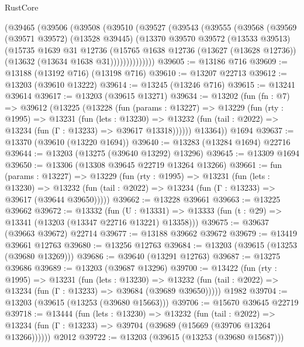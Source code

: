 \begin{lexlean}{RustCore}
\begin{coremodule}
    (@39465
      (@39506
        (@39508
          (@39510
            (@39527
              (@39543
                (@39555
                  (@39568
                    (@39569
                      (@39571 @39572)
                      (@13528 @39445)
                      (@13370
                        @39570
                        @39572
                        (@13533 @39513)
                        (@15735
                          @1639
                          @31
                          @12736
                          (@15765
                            @1638
                            @12736
                            (@13627 (@13628 @12736))
                            (@13632 (@13634 @1638 @31))))))))))))))
@39605 := @13186 @716
@39609 := @13188 (@13192 @716) (@13198 @716)
@39610 := @13207 @22713
@39612 := @13203 (@39610 @13222)
@39614 := @13245 (@13246 @716)
@39615 := @13241 @39614
@39617 := @13203 (@39615 @13271)
@39634 := @13202
    (fun (fn : @7) =>
    @39612
      (@13225
        (@13228
          (fun (params : @13227) =>
          @13229
            (fun (rty : @1995) =>
            @13231
              (fun (lets : @13230) =>
              @13232 (fun (tail : @2022) => @13234 (fun (Γ : @13233) => @39617 @13318))))))
        @13364))
    @1694
@39637 := @13370 (@39610 (@13220 @1694))
@39640 := @13283 (@13284 @1694) @22716
@39644 := @13203 (@13275 (@39640 @13292) @13296)
@39645 := @13309 @1694
@39650 := @13306 (@13308 @39645 @22719 @13264 @13266)
@39661 := fun (params : @13227) =>
  @13229
    (fun (rty : @1995) =>
    @13231
      (fun (lets : @13230) =>
      @13232 (fun (tail : @2022) => @13234 (fun (Γ : @13233) => @39617 (@39644 @39650)))))
@39662 := @13228 @39661
@39663 := @13225 @39662
@39672 := @13332
    (fun (U : @13331) => @13333 (fun (t : @29) => @13341 (@13203 (@13347 @22716 @13221) @13358)))
@39675 := @39637 (@39663 @39672) @22714
@39677 := @13188 @39662 @39672
@39679 := @13419 @39661 @12763
@39680 := @13256 @12763
@39684 := @13203 (@39615 (@13253 (@39680 @13269)))
@39686 := @39640 (@13291 @12763)
@39687 := @13275 @39686
@39689 := @13203 (@39687 @13296)
@39700 := @13422
    (fun (rty : @1995) =>
    @13231
      (fun (lets : @13230) =>
      @13232 (fun (tail : @2022) => @13234 (fun (Γ : @13233) => @39684 (@39689 @39650)))))
    @1982
@39704 := @13203 (@39615 (@13253 (@39680 @15663)))
@39706 := @15670 @39645 @22719
@39718 := @13444
    (fun (lets : @13230) =>
    @13232
      (fun (tail : @2022) =>
      @13234 (fun (Γ : @13233) => @39704 (@39689 (@15669 (@39706 @13264 @13266))))))
    @2012
@39722 := @13203 (@39615 (@13253 (@39680 @15687)))

\end{coremodule}
\end{lexlean}
